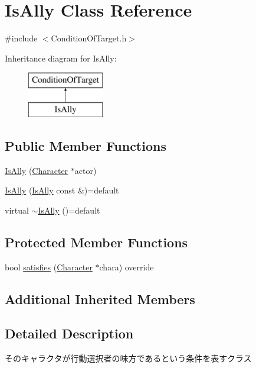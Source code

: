 \hypertarget{class_is_ally}{}\section{Is\+Ally Class Reference}
\label{class_is_ally}


{\ttfamily \#include $<$Condition\+Of\+Target.\+h$>$}

Inheritance diagram for Is\+Ally\+:\begin{figure}[H]
\begin{center}
\leavevmode
\includegraphics[height=2.000000cm]{class_is_ally}
\end{center}
\end{figure}
\subsection*{Public Member Functions}
\begin{DoxyCompactItemize}
\item 
\hyperlink{class_is_ally_a61c99b2d2b95bde567e84576a9a46348}{Is\+Ally} (\hyperlink{class_character}{Character} $\ast$actor)
\item 
\hyperlink{class_is_ally_a3761439209c95a462eb4937136559592}{Is\+Ally} (\hyperlink{class_is_ally}{Is\+Ally} const \&)=default
\item 
virtual \hyperlink{class_is_ally_a201dcbba057f67bec2ab1ccb0b19e2fc}{$\sim$\+Is\+Ally} ()=default
\end{DoxyCompactItemize}
\subsection*{Protected Member Functions}
\begin{DoxyCompactItemize}
\item 
bool \hyperlink{class_is_ally_a9537dc9a3912a8c5cf5d8950920e36f4}{satisfies} (\hyperlink{class_character}{Character} $\ast$chara) override
\end{DoxyCompactItemize}
\subsection*{Additional Inherited Members}


\subsection{Detailed Description}
そのキャラクタが行動選択者の味方であるという条件を表すクラス 

